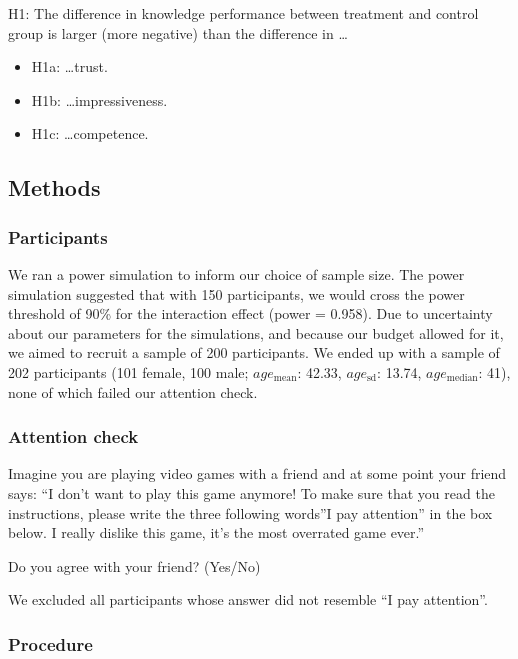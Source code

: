 \documentclass[
  english,
  doc,floatsintext]{apa6}
\begin{document}
H1: The difference in knowledge performance between treatment and control group is larger (more negative) than the difference in \ldots{}

\begin{itemize}
\item
  H1a: \ldots trust.
\item
  H1b: \ldots impressiveness.
\item
  H1c: \ldots competence.
\end{itemize}

\subsection{Methods}\label{methods-3}

\subsubsection{Participants}\label{participants-3}

We ran a power simulation to inform our choice of sample size. The power simulation suggested that with 150 participants, we would cross the power threshold of 90\% for the interaction effect (power = 0.958). Due to uncertainty about our parameters for the simulations, and because our budget allowed for it, we aimed to recruit a sample of 200 participants. We ended up with a sample of 202 participants (101 female, 100 male; \(age_\text{mean}\): 42.33, \(age_\text{sd}\): 13.74, \(age_\text{median}\): 41), none of which failed our attention check.

\subsubsection{Attention check}\label{attention-check-2}

Imagine you are playing video games with a friend and at some point your friend says: ``I don't want to play this game anymore! To make sure that you read the instructions, please write the three following words''I pay attention'' in the box below. I really dislike this game, it's the most overrated game ever.''

Do you agree with your friend? (Yes/No)

We excluded all participants whose answer did not resemble ``I pay attention''.

\subsubsection{Procedure}\label{procedure-3}
\end{document}
